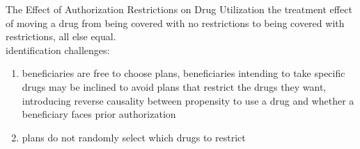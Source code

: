 \begin{frame}{The Effect of Authorization Restrictions on Drug Utilization}
    the treatment effect of moving a drug from being covered with no restrictions to being covered with restrictions, all else equal. \\
    
    identification challenges: 
    \begin{enumerate}
        \item beneficiaries are free to choose plans, beneficiaries intending to take specific drugs may be inclined to avoid plans that restrict the drugs they want, introducing reverse causality between propensity to use a drug and whether a beneficiary faces prior authorization
        \item plans do not randomly select which drugs to restrict
    \end{enumerate}
   
\end{frame}